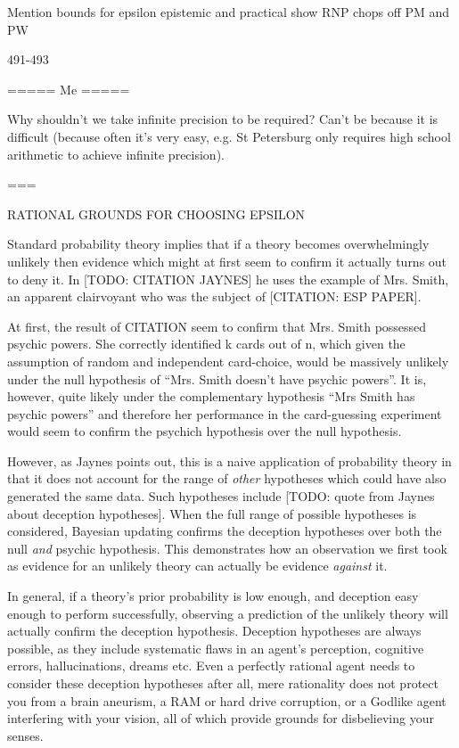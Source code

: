 
Mention bounds for epsilon epistemic and practical
show RNP chops off PM and PW

491-493


=====
Me
=====

Why shouldn't we take infinite precision to be required? Can't be because it is difficult (because often it's very easy, e.g. St Petersburg only requires high school arithmetic to achieve infinite precision).

===

RATIONAL GROUNDS FOR CHOOSING EPSILON

Standard probability theory implies that if a theory becomes overwhelmingly unlikely then evidence which might at first seem to confirm it actually turns out to deny it. In [TODO: CITATION JAYNES] he uses the example of Mrs. Smith, an apparent clairvoyant who was the subject of [CITATION: ESP PAPER]. 

At first, the result of CITATION seem to confirm that Mrs. Smith possessed psychic powers. She correctly identified k cards out of n, which given the assumption of random and independent card-choice, would be massively unlikely under the null hypothesis of ``Mrs. Smith doesn't have psychic powers''. It is, however, quite likely under the complementary hypothesis ``Mrs Smith has psychic powers'' and therefore her performance in the card-guessing experiment would seem to confirm the psychich hypothesis over the null hypothesis.

However, as Jaynes points out, this is a naive application of probability theory in that it does not account for the range of \textit{other} hypotheses which could have also generated the same data. Such hypotheses include [TODO: quote from Jaynes about deception hypotheses]. When the full range of possible hypotheses is considered, Bayesian updating confirms the deception hypotheses over both the null \textit{and} psychic hypothesis. This demonstrates how an observation we first took as evidence for an unlikely theory can actually be evidence \textit{against} it.

In general, if a theory's prior probability is low enough, and deception easy enough to perform successfully, observing a prediction of the unlikely theory will actually confirm the deception hypothesis. Deception hypotheses are always possible, as they include systematic flaws in an agent's perception, cognitive errors, hallucinations, dreams etc. Even a perfectly rational agent needs to consider these deception hypotheses \textemdash after all, mere rationality does not protect you from a brain aneurism, a RAM or hard drive corruption, or a Godlike agent interfering with your vision, all of which provide grounds for disbelieving your senses. 

